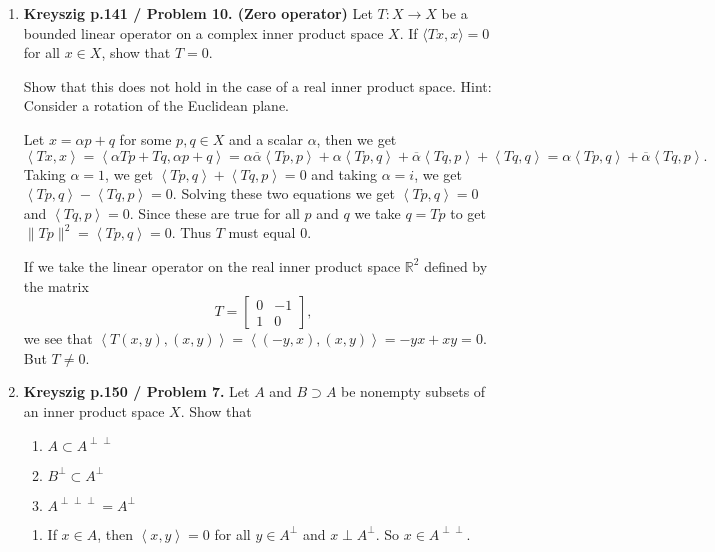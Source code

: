\documentclass[12pt]{article}
\newcommand{\rl}{\mathbb{R}}
\newcommand{\inn}[2]{\left\langle #1, #2 \right\rangle}
\begin{document}
\begin{enumerate}
\item
\textbf{Kreyszig p.141 / Problem 10. (Zero operator)}
Let $T: X\to X$ be a bounded linear operator on a complex
inner product space $X$. If $\langle Tx, x\rangle = 0$
for all $x\in X$, show that $T=0$.

Show that this does not hold in the case of a real inner
product space. Hint: Consider a rotation of the Euclidean
plane.
\begin{mybox}

    Let $x=\alpha p+q$ for some $p,q\in X$ and a
    scalar $\alpha$, then we get $$\inn{Tx}{x}=
    \inn{\alpha Tp+Tq}{\alpha p+q}=\alpha\overline{\alpha}
    \inn{Tp}{p}+
    \alpha\inn{Tp}{q}+
    \overline{\alpha}\inn{Tq}{p}+
    \inn{Tq}{q}=\alpha\inn{Tp}{q}+
    \overline{\alpha}\inn{Tq}{p}.$$
    Taking $\alpha=1$, we get $\inn{Tp}{q}+\inn{Tq}{p}=0$
    and taking $\alpha=i$, we get
    $\inn{Tp}{q}-\inn{Tq}{p}=0$. Solving these two equations
    we get $\inn{Tp}{q}=0$ and $\inn{Tq}{p}=0$. Since these
    are true for all $p$ and $q$ we take $q=Tp$ to get
    $\|Tp\|^2=\inn{Tp}{q}=0$. Thus $T$ must equal 0.

    \vspace*{3mm}
    If we take the linear operator on the real inner product
    space $\rl^2$ defined by the matrix
    $$T=\left[\begin{array}{cc}
        0 &-1\\
        1 &0
    \end{array}\right],$$
    we see that $\inn{T(x,y)}{(x,y)}=\inn{(-y,x)}{(x,y)}
    =-yx+xy=0.$ But $T\neq 0$.
\end{mybox}
 
\item \textbf{Kreyszig p.150 / Problem 7.}
Let $A$ and $B\supset A$ be nonempty subsets of an inner
product space $X$. Show that
\begin{enumerate}
    \item $A\subset A^{\perp\perp}$
    \item $B^{\perp}\subset A^{\perp}$
    \item $A^{\perp\perp\perp}=A^{\perp}$
\end{enumerate}

\begin{mybox}

    \begin{enumerate}
        \item If $x\in A$, then $\inn{x}{y} =0$ for all
        $y\in A^\perp$ and $x\perp A^\perp$. So $x\in
        A^{\perp\perp}.$


\end{enumerate}
\end{mybox}
\end{enumerate}
\end{document}
